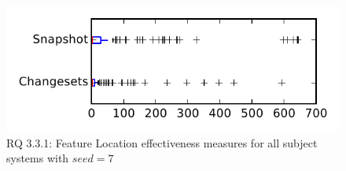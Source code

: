 
\begin{figure}
\centering
\includegraphics[height=0.4\textheight]{figures/flt_seed/rq1_tiny_7}
\caption{RQ 3.3.1: Feature Location effectiveness measures for all subject systems with $seed=7$}
\label{fig:flt_seed:rq1:tiny}
\end{figure}
